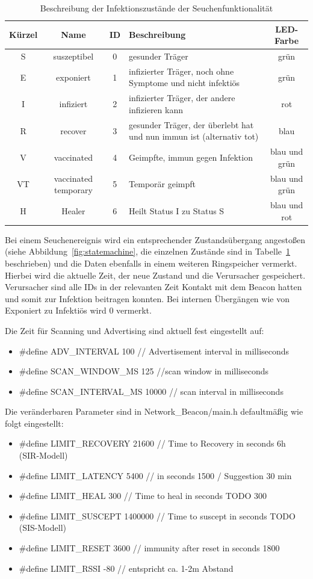 \documentclass[11pt,ngerman]{scrartcl} %
\begin{document}
\begin{table}[h]
  \centering
  \begin{tabular}{cccp{7cm}c}
    Kürzel & Name & ID & Beschreibung & LED-Farbe \\\hline
    S & suszeptibel & 0 & gesunder Träger & grün \\
    E & exponiert & 1 & infizierter Träger, noch ohne Symptome und nicht infektiös & grün \\
    I & infiziert & 2 & infizierter Träger, der andere infizieren kann & rot \\
    R & recover & 3 & gesunder Träger, der überlebt hat und nun immun ist (alternativ tot) & blau \\
    V & vaccinated & 4 &Geimpfte, immun gegen Infektion & blau und grün \\
    VT & vaccinated temporary & 5 & Temporär geimpft & blau und grün \\
    H & Healer & 6 & Heilt Status I zu Status S & blau und rot \\
  \end{tabular}
  \caption{Beschreibung der Infektionszustände der Seuchenfunktionalität}
  \label{tab:infectioninfo}
\end{table}

Bei einem Seuchenereignis wird ein entsprechender Zustandsübergang angestoßen (siehe Abbildung~\ref{fig:statemachine}, die einzelnen Zustände sind in Tabelle~\ref{tab:infectioninfo} beschrieben) und die Daten ebenfalls in einem weiteren Ringspeicher vermerkt. Hierbei wird die aktuelle Zeit, der neue Zustand und die Verursacher gespeichert. Verursacher sind alle IDs in der relevanten Zeit Kontakt mit dem Beacon hatten und somit zur Infektion beitragen konnten. Bei internen Übergängen wie von Exponiert zu Infektiös wird 0 vermerkt.

Die Zeit für Scanning und Advertising sind aktuell fest eingestellt auf:
\begin{itemize}
\item \#define ADV\_INTERVAL				100 // Advertisement interval in milliseconds
\item \#define SCAN\_WINDOW\_MS				125  //scan window in milliseconds
\item \#define SCAN\_INTERVAL\_MS			10000  // scan interval in milliseconds
\end{itemize}


Die veränderbaren Parameter sind in Network\_Beacon/main.h defaultmäßig wie folgt eingestellt:
\begin{itemize}
\item \#define LIMIT\_RECOVERY				21600 // Time to Recovery in seconds     6h (SIR-Modell)
\item \#define LIMIT\_LATENCY				5400 //  in seconds 1500  / Suggestion 30 min
\item \#define LIMIT\_HEAL					300 // Time to heal in seconds TODO 300
\item \#define LIMIT\_SUSCEPT				1400000 // Time to suscept in seconds TODO (SIS-Modell)
\item \#define LIMIT\_RESET					3600 // immunity after reset in seconds 1800
\item \#define LIMIT\_RSSI		 			-80 // entspricht ca. 1-2m Abstand
\end{itemize}
\end{document}
